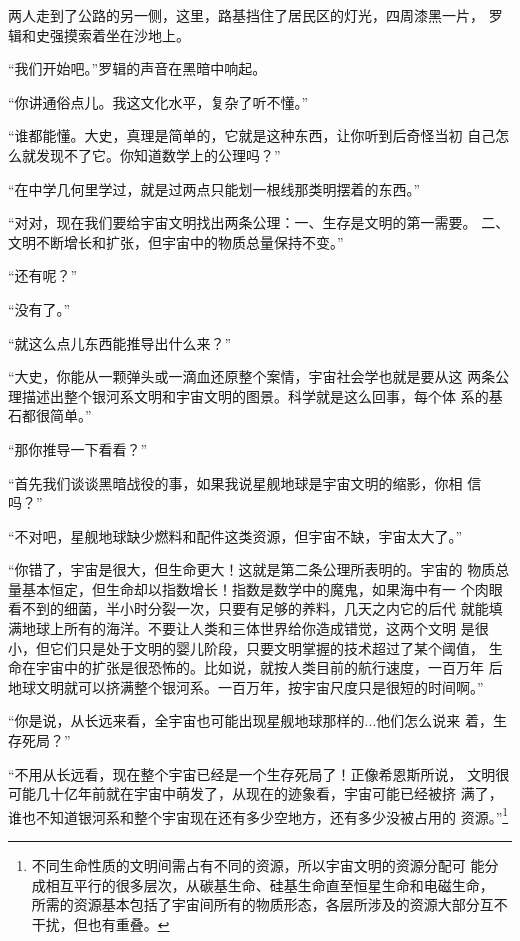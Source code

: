 两人走到了公路的另一侧，这里，路基挡住了居民区的灯光，四周漆黑一片，
罗辑和史强摸索着坐在沙地上。
\marginparwidth=17mm
\marginpar{\kai\textcolor{red}{尼玛不要把最精华的部分透露出来好不好啊！}}

“我们开始吧。”罗辑的声音在黑暗中响起。

“你讲通俗点儿。我这文化水平，复杂了听不懂。”

“谁都能懂。大史，真理是简单的，它就是这种东西，让你听到后奇怪当初
自己怎么就发现不了它。你知道数学上的公理吗？”

“在中学几何里学过，就是过两点只能划一根线那类明摆着的东西。”

“对对，现在我们要给宇宙文明找出两条公理：一、生存是文明的第一需要。
二、文明不断增长和扩张，但宇宙中的物质总量保持不变。”

“还有呢？”

“没有了。”

“就这么点儿东西能推导出什么来？”

“大史，你能从一颗弹头或一滴血还原整个案情，宇宙社会学也就是要从这
两条公理描述出整个银河系文明和宇宙文明的图景。科学就是这么回事，每个体
系的基石都很简单。”

“那你推导一下看看？”

“首先我们谈谈黑暗战役的事，如果我说星舰地球是宇宙文明的缩影，你相
信吗？”

“不对吧，星舰地球缺少燃料和配件这类资源，但宇宙不缺，宇宙太大了。”

“你错了，宇宙是很大，但生命更大！这就是第二条公理所表明的。宇宙的
物质总量基本恒定，但生命却以指数增长！指数是数学中的魔鬼，如果海中有一
个肉眼看不到的细菌，半小时分裂一次，只要有足够的养料，几天之内它的后代
就能填满地球上所有的海洋。不要让人类和三体世界给你造成错觉，这两个文明
是很小，但它们只是处于文明的婴儿阶段，只要文明掌握的技术超过了某个阈值，
生命在宇宙中的扩张是很恐怖的。比如说，就按人类目前的航行速度，一百万年
后地球文明就可以挤满整个银河系。一百万年，按宇宙尺度只是很短的时间啊。”

“你是说，从长远来看，全宇宙也可能出现星舰地球那样的...他们怎么说来
着，生存死局？”

“不用从长远看，现在整个宇宙已经是一个生存死局了！正像希恩斯所说，
文明很可能几十亿年前就在宇宙中萌发了，从现在的迹象看，宇宙可能已经被挤
满了，谁也不知道银河系和整个宇宙现在还有多少空地方，还有多少没被占用的
资源。”\footnote{不同生命性质的文明间需占有不同的资源，所以宇宙文明的资源分配可
能分成相互平行的很多层次，从碳基生命、硅基生命直至恒星生命和电磁生命，
所需的资源基本包括了宇宙间所有的物质形态，各层所涉及的资源大部分互不
干扰，但也有重叠。}

